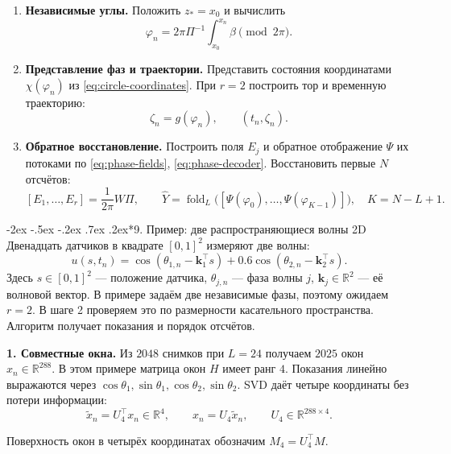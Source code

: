 \documentclass[11pt,a4paper]{article}
\makeatletter
\renewcommand\section{\@startsection{section}{1}{\z@}%
  {-2ex \@plus -.5ex \@minus -.2ex}%
  {.7ex \@plus .2ex}{\normalfont\Large\bfseries}}
\makeatother
\begin{document}
\begin{minipage}{\textwidth}
\begin{algorithm}[H]
\begin{enumerate}
$H_1(M;\mathbb Z)$. Их периоды составляют матрицу $\Pi$ по \eqref{eq:period-matrix}.
\item \textbf{Независимые углы.} Положить $z_*=x_0$ и вычислить
$$
\varphi_n=2\pi\Pi^{-1}\int_{x_0}^{x_n}\beta\pmod{2\pi}.
$$
\item \textbf{Представление фаз и траектории.} Представить состояния координатами
$\chi(\varphi_n)$ из \eqref{eq:circle-coordinates}. При $r=2$ построить тор и временную траекторию:
$$
\zeta_n=g(\varphi_n),\qquad (t_n,\zeta_n).
$$
\item \textbf{Обратное восстановление.} Построить поля $E_j$ и обратное
отображение $\Psi$ их потоками по \eqref{eq:phase-fields}, \eqref{eq:phase-decoder}. Восстановить первые $N$ отсчётов:
$$
[E_1,\ldots,E_r]=\frac{1}{2\pi}W\Pi,\qquad
\widehat Y=\operatorname{fold}_L
\bigl([\Psi(\varphi_0),\ldots,\Psi(\varphi_{K-1})]\bigr),\quad K=N-L+1.
$$
\end{enumerate}
\end{algorithm}

\end{minipage}

\newpage
\section*{9. Пример: две распространяющиеся волны 2D}
Двенадцать датчиков в квадрате $[0,1]^2$ измеряют две волны:
$$
u(s,t_n)=\cos(\theta_{1,n}-\mathbf k_1^\top s)
+0.6\cos(\theta_{2,n}-\mathbf k_2^\top s).
$$
Здесь $s\in[0,1]^2$ --- положение датчика, $\theta_{j,n}$ --- фаза волны $j$,
$\mathbf k_j\in\mathbb R^2$ --- её волновой вектор. В примере задаём две независимые фазы, поэтому ожидаем $r=2$.
В шаге 2 проверяем это по размерности касательного пространства.
Алгоритм получает показания и порядок отсчётов.

\textbf{1. Совместные окна.}
Из $2048$ снимков при $L=24$ получаем $2025$ окон $x_n\in\mathbb R^{288}$.
В этом примере матрица окон $H$ имеет ранг $4$. Показания линейно выражаются через
$\cos\theta_1,\sin\theta_1,\cos\theta_2,\sin\theta_2$.
SVD даёт четыре координаты без потери информации:
$$
\widetilde x_n=U_4^\top x_n\in\mathbb R^4,\qquad
x_n=U_4\widetilde x_n,\qquad U_4\in\mathbb R^{288\times4}.
$$

Поверхность окон в четырёх координатах обозначим $M_4=U_4^\top M$.
\end{document}
